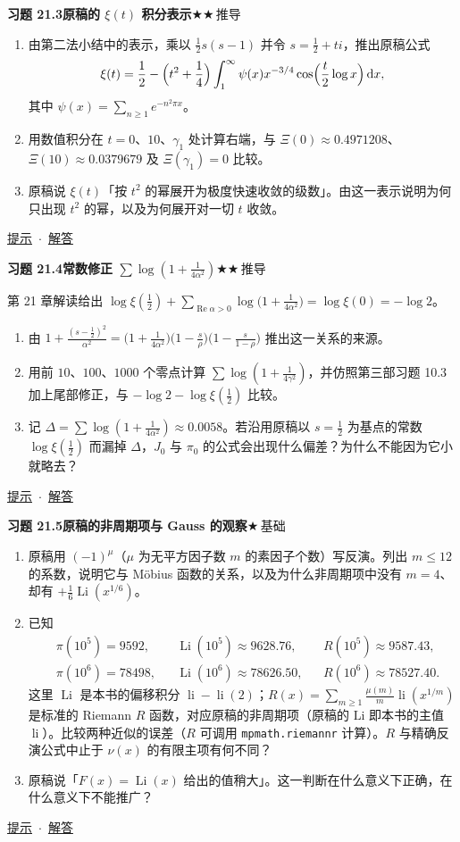 \documentclass[11pt,a4paper]{article}
\DeclareMathOperator{\Li}{Li}
\DeclareMathOperator{\li}{li}
\newcommand{\dd}{\,\mathrm{d}}
\renewcommand{\Re}{\operatorname{Re}}
\newcommand{\lvI}{$\bigstar$\,基础}
\newcommand{\lvII}{$\bigstar\bigstar$\,推导}
\newcommand{\Q}[3]{%
  \par\addvspace{1.1em}\noindent
  \hypertarget{q:#1}{}\textbf{习题 #1}\quad\textbf{#3}\hfill{\small #2}\par
  \nopagebreak\smallskip}
\newcommand{\toHint}[1]{\hfill{\small\hyperlink{h:#1}{提示}\ $\cdot$\ \hyperlink{s:#1}{解答}}}
\begin{document}
\Q{21.3}{\lvII}{原稿的 $\xi(t)$ 积分表示}
\begin{enumerate}
  \item 由第二法小结中的表示，乘以 $\frac12s(s-1)$ 并令 $s=\frac12+ti$，推出原稿公式
  \[
    \xi(t)=\frac12-\Bigl(t^2+\frac14\Bigr)\int_1^\infty\psi(x)x^{-3/4}\cos\Bigl(\frac t2\log x\Bigr)\dd x ,
  \]
  其中 $\psi(x)=\sum_{n\ge1}e^{-n^2\pi x}$。
  \item 用数值积分在 $t=0$、$10$、$\gamma_1$ 处计算右端，与 $\Xi(0)\approx0.4971208$、$\Xi(10)\approx0.0379679$ 及 $\Xi(\gamma_1)=0$ 比较。
  \item 原稿说 $\xi(t)$「按 $t^2$ 的幂展开为极度快速收敛的级数」。由这一表示说明为何只出现 $t^2$ 的幂，以及为何展开对一切 $t$ 收敛。
\end{enumerate}
\toHint{21.3}

\Q{21.4}{\lvII}{常数修正 $\sum\log(1+\frac1{4\alpha^2})$}
第 21 章解读给出 $\log\xi(\frac12)+\sum_{\Re\alpha>0}\log\bigl(1+\frac1{4\alpha^2}\bigr)=\log\xi(0)=-\log2$。
\begin{enumerate}
  \item 由 $1+\frac{(s-\frac12)^2}{\alpha^2}=\bigl(1+\frac1{4\alpha^2}\bigr)\bigl(1-\frac s\rho\bigr)\bigl(1-\frac s{1-\rho}\bigr)$ 推出这一关系的来源。
  \item 用前 $10$、$100$、$1000$ 个零点计算 $\sum\log(1+\frac1{4\gamma^2})$，并仿照第三部习题 10.3 加上尾部修正，与 $-\log2-\log\xi(\frac12)$ 比较。
  \item 记 $\Delta=\sum\log(1+\frac1{4\alpha^2})\approx0.0058$。若沿用原稿以 $s=\frac12$ 为基点的常数 $\log\xi(\frac12)$ 而漏掉 $\Delta$，$J_0$ 与 $\pi_0$ 的公式会出现什么偏差？为什么不能因为它小就略去？
\end{enumerate}
\toHint{21.4}

\Q{21.5}{\lvI}{原稿的非周期项与 Gauss 的观察}
\begin{enumerate}
  \item 原稿用 $(-1)^\mu$（$\mu$ 为无平方因子数 $m$ 的素因子个数）写反演。列出 $m\le12$ 的系数，说明它与 Möbius 函数的关系，以及为什么非周期项中没有 $m=4$、却有 $+\frac16\Li(x^{1/6})$。
  \item 已知
  \[
    \begin{aligned}
    &\pi(10^5)=9592,&&\Li(10^5)\approx9628.76,&&R(10^5)\approx9587.43,\\
    &\pi(10^6)=78498,&&\Li(10^6)\approx78626.50,&&R(10^6)\approx78527.40.
    \end{aligned}
  \]
  这里 $\Li$ 是本书的偏移积分 $\li-\li(2)$；$R(x)=\sum_{m\ge1}\frac{\mu(m)}m\li(x^{1/m})$ 是标准的 Riemann $R$ 函数，对应原稿的非周期项（原稿的 $\mathrm{Li}$ 即本书的主值 $\li$）。比较两种近似的误差（$R$ 可调用 \texttt{mpmath.riemannr} 计算）。$R$ 与精确反演公式中止于 $\nu(x)$ 的有限主项有何不同？
  \item 原稿说「$F(x)=\Li(x)$ 给出的值稍大」。这一判断在什么意义下正确，在什么意义下不能推广？
\end{enumerate}
\toHint{21.5}
\end{document}
